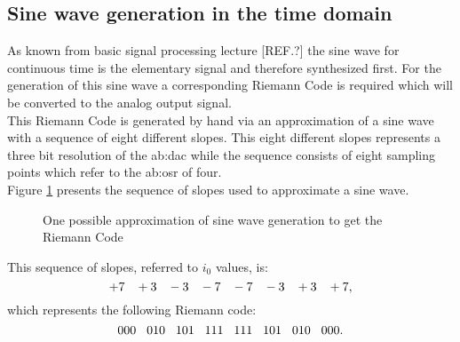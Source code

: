 \subsection{Sine wave generation in the time domain}
As known from basic signal processing lecture
[REF.?] the sine wave for continuous time is the elementary signal and therefore synthesized first. 
For the generation of this sine wave a corresponding Riemann Code is required which will be converted to the analog output signal.\\
This Riemann Code is generated by hand via an approximation of a sine wave with a sequence of eight different slopes.
This eight different slopes represents a three bit resolution of the \gls{ab:dac} while the sequence consists of eight sampling points which refer to the \gls{ab:osr} of four.\\
Figure \ref{fig:RiemannCodeGenerationSineWave} presents the sequence of slopes used to approximate a sine wave. 




\begin{figure}[htb!]
   \centering 
   
   \caption{One possible approximation of sine wave generation to get the Riemann Code}
   \label{fig:RiemannCodeGenerationSineWave}
\end{figure}


This sequence of slopes, referred to $i_0$ values, is:
\begin{equation}
 +7\hspace{.3cm} +3\hspace{.3cm} -3\hspace{.3cm} -7\hspace{.3cm} -7\hspace{.3cm} -3\hspace{.3cm} +3\hspace{.3cm} +7,
 \end{equation} which represents the following Riemann code:
\begin{equation}
000\hspace{.3cm} 010\hspace{.3cm} 101\hspace{.3cm} 111\hspace{.3cm} 111\hspace{.3cm} 101\hspace{.3cm} 010\hspace{.3cm} 000.
\end{equation}
\label{eq:RiemannCodeSineWave} 
   
